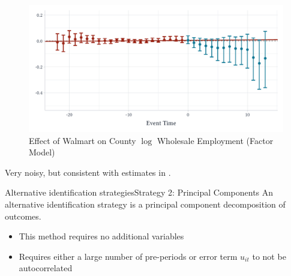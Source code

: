 \documentclass[aspectratio=169,t,11pt]{beamer}
\begin{document}
\begin{frame}{}
  \vspace{-\bigskipamount}
  \begin{figure}
    \caption{Effect of Walmart on County $\log$ Wholesale Employment (Factor Model)}
    \begin{adjustbox}{width=0.85\textwidth}
      \includegraphics{../figures/qld_wholesale.pdf}
    \end{adjustbox}
  \end{figure}

  Very noisy, but consistent with estimates in .
\end{frame}

\begin{frame}{Alternative identification strategies}{Strategy 2: Principal Components}\label{slide:pc_strategy}
  An alternative identification strategy is a principal component decomposition of outcomes. 
  \begin{itemize}
    \item This method requires no additional variables
    \item Requires either a large number of pre-periods  or error term $u_{it}$ to not be autocorrelated 
  \end{itemize} 

\end{frame}
\end{document}
